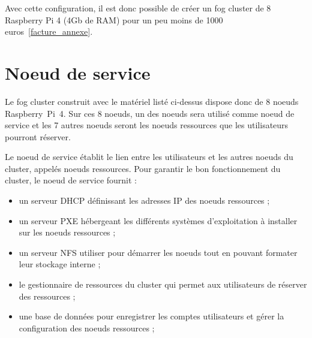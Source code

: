 \documentclass[letterpaper, 10 pt, conference]{ieeeconf}
\begin{document}
Avec cette configuration, il est donc possible de créer un fog cluster de 8 Raspberry Pi 4 (4Gb de RAM) pour un peu moins de 1000 euros~\ref{facture_annexe}.

\section{Noeud de service}
\label{sec:gestionnaire}
Le fog cluster construit avec le matériel listé ci-dessus dispose donc de 8 noeuds Raspberry~Pi~4. Sur ces 8 noeuds, un des noeuds sera utilisé comme noeud de service et les 7 autres noeuds seront les noeuds ressources que les utilisateurs pourront réserver.

Le noeud de service établit le lien entre les utilisateurs et les autres noeuds du cluster, appelés noeuds ressources. Pour garantir le bon fonctionnement du cluster, le noeud de service fournit :
\begin{itemize}
    \item un serveur DHCP définissant les adresses IP des noeuds ressources ;
    \item un serveur PXE hébergeant les différents systèmes d'exploitation à installer sur les noeuds ressources ;
    \item un serveur NFS utiliser pour démarrer les noeuds tout en pouvant formater leur stockage interne ;
    \item le gestionnaire de ressources du cluster qui permet aux utilisateurs de réserver des ressources ;
    \item une base de données pour enregistrer les comptes utilisateurs et gérer la configuration des noeuds ressources ;
\end{itemize}
\end{document}
